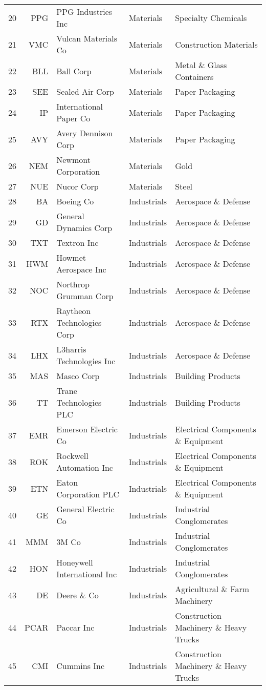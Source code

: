 \documentclass[aps, pra, groupedaddress, showkeys, twocolumn, floatfix, 10pt]{revtex4-2}
\begin{document}
{\begin{longtable}{rrllp{4cm}}
20&PPG&PPG Industries Inc&Materials&Specialty Chemicals \\
21&VMC&Vulcan Materials Co&Materials&Construction Materials \\
22&BLL&Ball Corp&Materials&Metal \& Glass Containers \\
23&SEE&Sealed Air Corp&Materials&Paper Packaging \\
24&IP&International Paper Co&Materials&Paper Packaging \\
25&AVY&Avery Dennison Corp&Materials&Paper Packaging \\
26&NEM&Newmont Corporation&Materials&Gold \\
27&NUE&Nucor Corp&Materials&Steel \\
28&BA&Boeing Co&Industrials&Aerospace \& Defense \\
29&GD&General Dynamics Corp&Industrials&Aerospace \& Defense \\
30&TXT&Textron Inc&Industrials&Aerospace \& Defense \\
31&HWM&Howmet Aerospace Inc&Industrials&Aerospace \& Defense \\
32&NOC&Northrop Grumman Corp&Industrials&Aerospace \& Defense \\
33&RTX&Raytheon Technologies Corp&Industrials&Aerospace \& Defense \\
34&LHX&L3harris Technologies Inc&Industrials&Aerospace \& Defense \\
35&MAS&Masco Corp&Industrials&Building Products \\
36&TT&Trane Technologies PLC&Industrials&Building Products \\
37&EMR&Emerson Electric Co&Industrials&Electrical Components \& Equipment \\
38&ROK&Rockwell Automation Inc&Industrials&Electrical Components \& Equipment \\
39&ETN&Eaton Corporation PLC&Industrials&Electrical Components \& Equipment \\
40&GE&General Electric Co&Industrials&Industrial Conglomerates \\
41&MMM&3M Co&Industrials&Industrial Conglomerates \\
42&HON&Honeywell International Inc&Industrials&Industrial Conglomerates \\
43&DE&Deere \& Co&Industrials&Agricultural \& Farm Machinery \\
44&PCAR&Paccar Inc&Industrials&Construction Machinery \& Heavy Trucks \\
45&CMI&Cummins Inc&Industrials&Construction Machinery \& Heavy Trucks \\

\end{longtable}}
\end{document}
